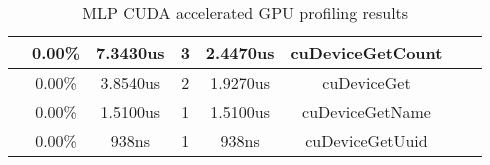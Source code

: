 \documentclass[11pt]{article}
\begin{document}
\begin{table}[h]
\begin{tabular}{|l|c|c|c|c|c|c|c|}
		              & 0.00\%              & 7.3430us      & 3              & 2.4470us     & cuDeviceGetCount      \\ \hline
		              & 0.00\%              & 3.8540us      & 2              & 1.9270us     & cuDeviceGet           \\ \hline
		              & 0.00\%              & 1.5100us      & 1              & 1.5100us     & cuDeviceGetName       \\ \hline
		              & 0.00\%              & 938ns         & 1              & 938ns        & cuDeviceGetUuid       \\ \hline
	\end{tabular}
	\caption{MLP CUDA accelerated GPU profiling results}
	\label{tab:mlp_cuda_profiler}
\end{table}
\end{document}

